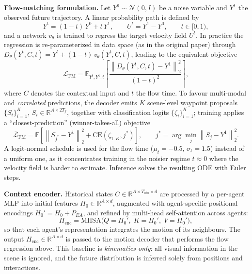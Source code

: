 \documentclass[11pt,a4paper]{article}
\begin{document}
\textbf{Flow-matching formulation.} Let $Y^0 \sim \mathcal{N}(0,I)$ be a noise
variable and $Y^1$ the observed future trajectory. A linear probability path is
defined by
\begin{equation}
    Y^t = (1-t)\,Y^0 + t\,Y^1, \qquad U^t = Y^1 - Y^0, \qquad t \in [0,1),
\end{equation}
and a network $v_\theta$ is trained to regress the target velocity field $U^t$.
In practice the regression is re-parameterized in data space (as in the original
paper) through $D_\theta(Y^t, C, t) = Y^t + (1-t)\,v_\theta(Y^t, C, t)$, leading
to the equivalent objective
\begin{equation}
    \mathcal{L}_{\mathrm{FM}}
    = \mathbb{E}_{Y^t, Y^1, t}\!\left[
        \frac{\left\| D_\theta(Y^t, C, t) - Y^1 \right\|_2^2}{(1-t)^2}
    \right],
\end{equation}
where $C$ denotes the contextual input and $t$ the flow time. To favour
multi-modal and \emph{correlated} predictions, the decoder emits $K$ scene-level
waypoint proposals $\{S_i\}_{i=1}^K$, $S_i \in \mathbb{R}^{A \times 2T_f}$,
together with classification logits $\{\zeta_i\}_{i=1}^K$; training applies a
``closest-prediction'' (winner-takes-all) objective
\begin{equation}
    \bar{\mathcal{L}}_{\mathrm{FM}}
    = \mathbb{E}\!\left[ \left\| S_{j^*} - Y^1 \right\|_2^2
      + \mathrm{CE}(\zeta_{1:K}, j^*) \right],
    \qquad j^* = \arg\min_j \left\| S_j - Y^1 \right\|_2^2.
\end{equation}
A logit-normal schedule is used for the flow time ($\mu_t = -0.5$, $\sigma_t =
1.5$) instead of a uniform one, as it concentrates training in the noisier
regime $t \approx 0$ where the velocity field is harder to estimate. Inference
solves the resulting ODE with Euler steps.

\textbf{Context encoder.} Historical states $C \in \mathbb{R}^{A \times T_{\mathrm{obs}}
\times d}$ are processed by a per-agent MLP into initial features $H_0 \in
\mathbb{R}^{A \times d}$, augmented with agent-specific positional encodings
$H_0' = H_0 + P_{EA}$, and refined by multi-head self-attention across agents:
\begin{equation}
    H_{\mathrm{enc}} = \mathrm{MHSA}\big(Q=H_0',\; K=H_0',\; V=H_0'\big),
\end{equation}
so that each agent's representation integrates the motion of its neighbours.
The output $H_{\mathrm{enc}} \in \mathbb{R}^{A \times d}$ is passed to the
motion decoder that performs the flow regression above. This baseline is
\emph{kinematics-only}: all visual information in the scene is ignored, and the
future distribution is inferred solely from positions and interactions.
\end{document}
